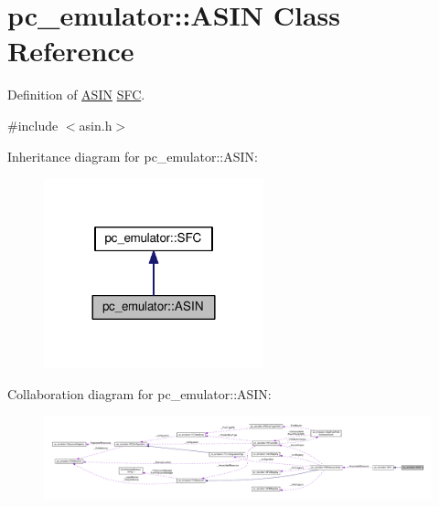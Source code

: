\hypertarget{classpc__emulator_1_1ASIN}{}\section{pc\+\_\+emulator\+:\+:A\+S\+IN Class Reference}
\label{classpc__emulator_1_1ASIN}


Definition of \hyperlink{classpc__emulator_1_1ASIN}{A\+S\+IN} \hyperlink{classpc__emulator_1_1SFC}{S\+FC}.  




{\ttfamily \#include $<$asin.\+h$>$}



Inheritance diagram for pc\+\_\+emulator\+:\+:A\+S\+IN\+:\nopagebreak
\begin{figure}[H]
\begin{center}
\leavevmode
\includegraphics[width=180pt]{classpc__emulator_1_1ASIN__inherit__graph}
\end{center}
\end{figure}


Collaboration diagram for pc\+\_\+emulator\+:\+:A\+S\+IN\+:\nopagebreak
\begin{figure}[H]
\begin{center}
\leavevmode
\includegraphics[width=350pt]{classpc__emulator_1_1ASIN__coll__graph}
\end{center}
\end{figure}
